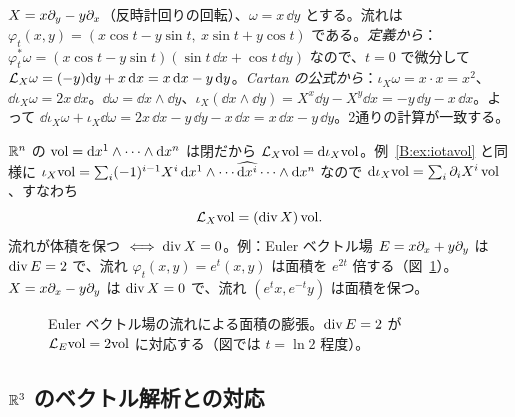 \begin{ex}\label{B:ex:rotlie}
$X=x\partial_y-y\partial_x$（反時計回りの回転）、$\omega=x\,\dd y$ とする。流れは $\varphi_t(x,y)=(x\cos t-y\sin t,\ x\sin t+y\cos t)$ である。\emph{定義から}：$\varphi_t^*\omega=(x\cos t-y\sin t)(\sin t\,\dd x+\cos t\,\dd y)$ なので、$t=0$ で微分して
$\mathcal L_X\omega=(-y)\mathrm{d} y+x\,\mathrm{d} x=x\,\mathrm{d} x-y\,\mathrm{d} y$。\emph{Cartan の公式から}：$\iota_X\omega=x\cdot x=x^2$、$\dd\iota_X\omega=2x\,\dd x$。$\dd\omega=\dd x\wedge\dd y$、$\iota_X(\dd x\wedge\dd y)=X^x\dd y-X^y\dd x=-y\,\dd y-x\,\dd x$。よって $\dd\iota_X\omega+\iota_X\dd\omega=2x\,\dd x-y\,\dd y-x\,\dd x=x\,\dd x-y\,\dd y$。2通りの計算が一致する。
\end{ex}

\begin{ex}[体積形式と発散]\label{B:ex:div}
$\mathbb R^n$ の $\mathrm{vol}=\mathrm{d} x^1\wedge\cdots\wedge\mathrm{d} x^n$ は閉だから $\mathcal L_X\mathrm{vol}=\mathrm{d}\iota_X\mathrm{vol}$。例~\ref{B:ex:iotavol} と同様に $\iota_X\mathrm{vol}=\sum_i(-1)^{i-1}X^i\,\mathrm{d} x^1\wedge\cdots\widehat{\mathrm{d} x^i}\cdots\wedge\mathrm{d} x^n$ なので $\mathrm{d}\iota_X\mathrm{vol}=\sum_i\partial_iX^i\,\mathrm{vol}$、すなわち
\[
\mathcal L_X\mathrm{vol}=(\operatorname{div} X)\,\mathrm{vol} .
\]
流れが体積を保つ $\iff\operatorname{div} X=0$。例：Euler ベクトル場 $E=x\partial_x+y\partial_y$ は $\operatorname{div} E=2$ で、流れ $\varphi_t(x,y)=e^t(x,y)$ は面積を $e^{2t}$ 倍する（図~\ref{B:fig:euler}）。$X=x\partial_x-y\partial_y$ は $\operatorname{div} X=0$ で、流れ $(e^tx,e^{-t}y)$ は面積を保つ。
\end{ex}

\begin{figure}[ht]
\centering
{}
\caption{Euler ベクトル場の流れによる面積の膨張。$\operatorname{div} E=2$ が $\mathcal L_E\mathrm{vol}=2\mathrm{vol}$ に対応する（図では $t=\ln 2$ 程度）。}\label{B:fig:euler}
\end{figure}

\subsection{$\mathbb R^3$ のベクトル解析との対応}\label{B:ss:vec}

